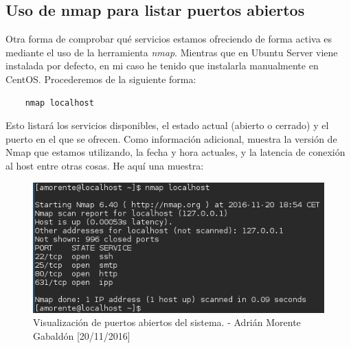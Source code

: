 	\subsection{Uso de nmap para listar puertos abiertos}
	Otra forma de comprobar qué servicios estamos ofreciendo de forma activa es mediante el uso de la herramienta \emph{nmap}. Mientras que en Ubuntu Server viene instalada por defecto, en mi caso he tenido que instalarla manualmente en CentOS. Procederemos de la siguiente forma:
	\begin{verbatim}
	nmap localhost
	\end{verbatim}
	Esto listará los servicios disponibles, el estado actual (abierto o cerrado) y el puerto en el que se ofrecen. Como información adicional, muestra la versión de Nmap que estamos utilizando, la fecha y hora actuales, y la latencia de conexión al host entre otras cosas. He aquí una muestra:
	\begin{figure}[H]
		\centering
		\includegraphics[scale=0.75]{nmap-localhost}
		\caption{Visualización de puertos abiertos del sistema. - Adrián Morente Gabaldón [20/11/2016]}
		\label{fig:figura3}
	\end{figure}
	

